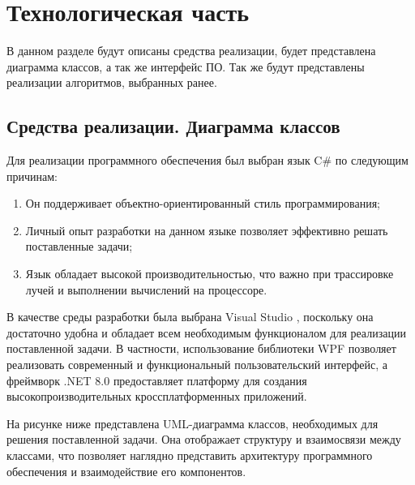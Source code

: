 \chapter{Технологическая часть}

В данном разделе будут описаны средства реализации, будет представлена диаграмма классов, а так же интерфейс ПО. Так же будут представлены реализации алгоритмов, выбранных ранее.

\section{Средства реализации. Диаграмма классов}
Для реализации программного обеспечения был выбран язык C\# по следующим причинам:
\begin{enumerate}
	\item Он поддерживает объектно-ориентированный стиль программирования;
	\item Личный опыт разработки на данном языке позволяет эффективно решать поставленные задачи;
	\item Язык обладает высокой производительностью, что важно при трассировке лучей и выполнении вычислений на процессоре.
\end{enumerate}

В качестве среды разработки была выбрана Visual Studio \cite{b7}, поскольку она достаточно удобна и обладает всем необходимым функционалом для реализации поставленной задачи. В частности, использование библиотеки WPF \cite{b6} позволяет реализовать современный и функциональный пользовательский интерфейс, а фреймворк .NET 8.0 \cite{b8} предоставляет платформу для создания высокопроизводительных кроссплатформенных приложений.

На рисунке ниже представлена UML-диаграмма классов, необходимых для решения поставленной задачи. Она отображает структуру и взаимосвязи между  классами, что позволяет наглядно представить архитектуру программного обеспечения и взаимодействие его компонентов.

